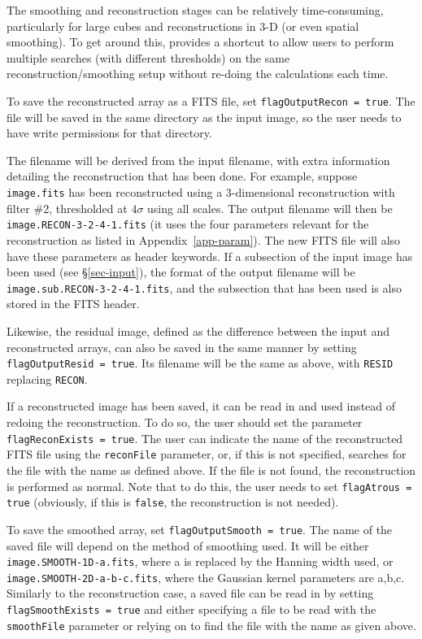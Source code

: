 \label{sec-reconIO}

The smoothing and reconstruction stages can be relatively
time-consuming, particularly for large cubes and reconstructions in
3-D (or even spatial smoothing). To get around this, \duchamp provides
a shortcut to allow users to perform multiple searches (\eg with
different thresholds) on the same reconstruction/smoothing setup
without re-doing the calculations each time.

To save the reconstructed array as a FITS file, set
\texttt{flagOutputRecon = true}. The file will be saved in the same
directory as the input image, so the user needs to have write
permissions for that directory.

The filename will be derived from the input filename, with extra
information detailing the reconstruction that has been done. For
example, suppose \texttt{image.fits} has been reconstructed using a
3-dimensional reconstruction with filter \#2, thresholded at $4\sigma$
using all scales. The output filename will then be
\texttt{image.RECON-3-2-4-1.fits} (\ie it uses the four parameters
relevant for the \atrous reconstruction as listed in
Appendix~\ref{app-param}). The new FITS file will also have these
parameters as header keywords. If a subsection of the input image has
been used (see \S\ref{sec-input}), the format of the output filename
will be \texttt{image.sub.RECON-3-2-4-1.fits}, and the subsection that
has been used is also stored in the FITS header.

Likewise, the residual image, defined as the difference between the
input and reconstructed arrays, can also be saved in the same manner
by setting \texttt{flagOutputResid = true}. Its filename will be the
same as above, with \texttt{RESID} replacing \texttt{RECON}.

If a reconstructed image has been saved, it can be read in and used
instead of redoing the reconstruction. To do so, the user should set
the parameter \texttt{flagReconExists = true}. The user can indicate
the name of the reconstructed FITS file using the \texttt{reconFile}
parameter, or, if this is not specified, \duchamp searches for the
file with the name as defined above. If the file is not found, the
reconstruction is performed as normal. Note that to do this, the user
needs to set \texttt{flagAtrous = true} (obviously, if this is
\texttt{false}, the reconstruction is not needed).

To save the smoothed array, set \texttt{flagOutputSmooth = true}. The
name of the saved file will depend on the method of smoothing used. It
will be either \texttt{image.SMOOTH-1D-a.fits}, where a is replaced by
the Hanning width used, or \texttt{image.SMOOTH-2D-a-b-c.fits}, where
the Gaussian kernel parameters are a,b,c. Similarly to the
reconstruction case, a saved file can be read in by setting
\texttt{flagSmoothExists = true} and either specifying a file to be
read with the \texttt{smoothFile} parameter or relying on \duchamp to
find the file with the name as given above.


